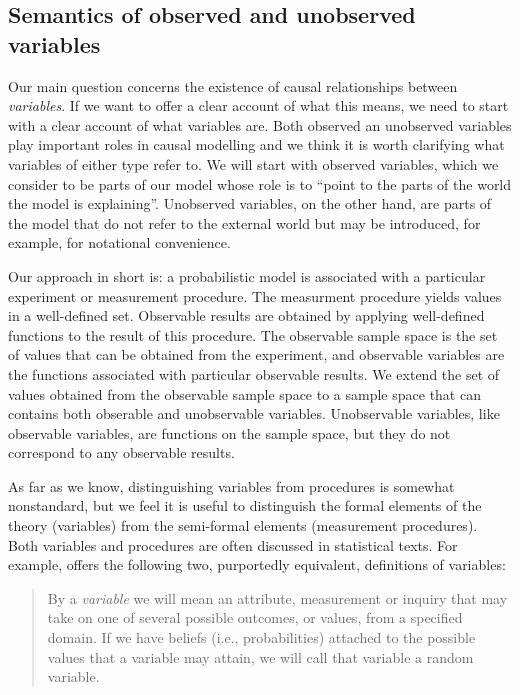 
\subsection{Semantics of observed and unobserved variables}\label{sec:variables}

Our main question concerns the existence of causal relationships between \emph{variables}. If we want to offer a clear account of what this means, we need to start with a clear account of what variables are. Both observed an unobserved variables play important roles in causal modelling and we think it is worth clarifying what variables of either type refer to. We will start with observed variables, which we consider to be parts of our model whose role is to ``point to the parts of the world the model is explaining''. Unobserved variables, on the other hand, are parts of the model that do not refer to the external world but may be introduced, for example, for notational convenience.

Our approach in short is: a probabilistic model is associated with a particular experiment or measurement procedure. The measurment procedure yields values in a well-defined set. Observable results are obtained by applying well-defined functions to the result of this procedure. The observable sample space is the set of values that can be obtained from the experiment, and observable variables are the functions associated with particular observable results. We extend the set of values obtained from the observable sample space to a sample space that can contains both obserable and unobservable variables. Unobservable variables, like observable variables, are functions on the sample space, but they do not correspond to any observable results.

As far as we know, distinguishing variables from procedures is somewhat nonstandard, but we feel it is useful to distinguish the formal elements of the theory (variables) from the semi-formal elements (measurement procedures). Both variables and procedures are often discussed in statistical texts. For example, \citet{pearl_causality:_2009} offers the following two, purportedly equivalent, definitions of variables:
\begin{quote}
By a \emph{variable} we will mean an attribute, measurement or inquiry that may take on one of several possible outcomes, or values, from a specified domain. If we have beliefs (i.e., probabilities) attached to the possible values that a variable may attain, we will call that variable a random variable.
\end{quote}

